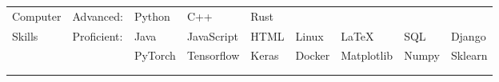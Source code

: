 \documentclass[10pt]{article}
\begin{document}

\begin{tabular}{p{1.5cm} l l l l l l l l}
Computer & Advanced:   & Python  & C++        & Rust \\
Skills   & Proficient: & Java    & JavaScript & HTML  & Linux  & \LaTeX     & SQL   & Django  \\
         &             & PyTorch & Tensorflow & Keras & Docker & Matplotlib & Numpy & Sklearn \\
\\
\\
\end{tabular}
\end{document}
